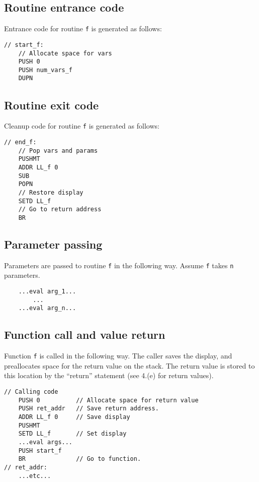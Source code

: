 \documentclass[11pt]{article}
\begin{document}
\subsection{Routine entrance code}

Entrance code for routine \texttt{f} is generated as follows:

\begin{verbatim}
// start_f:
    // Allocate space for vars
    PUSH 0
    PUSH num_vars_f
    DUPN
\end{verbatim}

\subsection{Routine exit code}

Cleanup code for routine \texttt{f} is generated as follows:

\begin{verbatim}
// end_f:
    // Pop vars and params
    PUSHMT
    ADDR LL_f 0
    SUB
    POPN
    // Restore display
    SETD LL_f
    // Go to return address
    BR
\end{verbatim}

\subsection{Parameter passing}

Parameters are passed to routine \texttt{f} in the following way.
Assume \texttt{f} takes \texttt{n} parameters.

\begin{verbatim}
    ...eval arg_1...
        ...
    ...eval arg_n...
\end{verbatim}

\subsection{Function call and value return}

Function \texttt{f} is called in the following way.  The caller saves the
display, and preallocates space for the return value on the stack.  The return
value is stored to this location by the ``return'' statement (see 4.(e) for
return values).

\begin{verbatim}
// Calling code
    PUSH 0          // Allocate space for return value
    PUSH ret_addr   // Save return address.
    ADDR LL_f 0     // Save display
    PUSHMT
    SETD LL_f       // Set display
    ...eval args...
    PUSH start_f
    BR              // Go to function.
// ret_addr:
    ...etc...
\end{verbatim}
\end{document}

